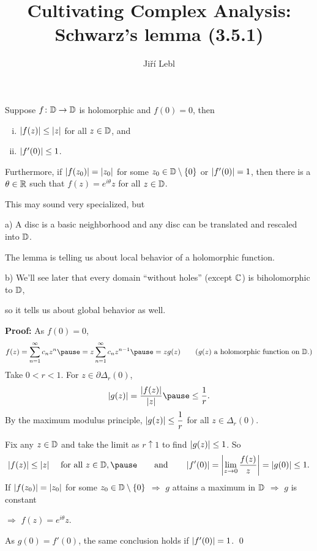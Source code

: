 \documentclass[10pt,aspectratio=169]{beamer}
\author{Ji\v{r}\'i Lebl}
\institute[OSU]{%
Departemento pri Matematiko de Oklahoma {\^S}tata Universitato}
\title{Cultivating Complex Analysis:\\%
Schwarz's lemma (3.5.1)}
\date{}
\begin{document}
\begin{frame}
\titlepage
\end{frame}

\begin{frame}
\begin{lemma}
Suppose $f \colon {\mathbb{D}} \to {\mathbb{D}}$ is holomorphic and $f(0) = 0$,
then 
\pause
\begin{enumerate}[(i)]
\item $\lvert {f(z)} \rvert \leq \lvert {z} \rvert$ for all $z \in {\mathbb{D}}$, and
\pause
\item $\lvert {f'(0)} \rvert \leq 1$.
\end{enumerate}
\pause
Furthermore, if $\lvert {f(z_0)} \rvert = \lvert {z_0} \rvert$ for some $z_0 \in {\mathbb{D}} \setminus
\{ 0 \}$
or $\lvert {f'(0)} \rvert = 1$, then
there is a $\theta \in {\mathbb{R}}$ such that $f(z) =
e^{i\theta} z$ for all $z \in {\mathbb{D}}$.
\end{lemma}

\pause

This may sound very specialized, but

\pause
\medskip

a) A disc is a basic neighborhood and any disc can be translated and rescaled
into ${\mathbb{D}}$. \pause

The lemma is telling us about local behavior of a holomorphic function.

\pause
\medskip

b) We'll see later that every domain ``without holes'' (except ${\mathbb{C}}$)
is biholomorphic to ${\mathbb{D}}$,

so it tells us about global behavior as well.

\end{frame}

\begin{frame}
\textbf{Proof:}
As $f(0) = 0$,
\[
f(z) = \sum_{n=1}^\infty c_n z^n \pause = z \sum_{n=1}^\infty c_n z^{n-1}
\pause = z g(z) \qquad \text{($g(z)$ a holomorphic function on $\D$.)}
\]
\pause
Take $0 < r < 1$.
For $z \in \partial \Delta_r(0)$,
\[
\sabs{g(z)} = \frac{\sabs{f(z)}}{\sabs{z}} \pause \leq \frac{1}{r} .
\]
\pause
By the maximum modulus principle,
$\lvert {g(z)} \rvert \leq \dfrac{1}{r}$ for all $z \in \Delta_r(0)$.

\pause
\medskip

Fix any $z \in {\mathbb{D}}$ and take the limit as $r \uparrow 1$ to find
$\lvert {g(z)} \rvert \leq 1$.
\pause
So
\[
\sabs{f(z)} \leq \sabs{z} \quad \text{ for all } z \in \D,
\pause \qquad \text{and} \qquad
\abs{f'(0)}
=
\abs{\lim_{z \to 0} \frac{f(z)}{z}} = \sabs{g(0)} \leq 1 .
\]
\pause
If $\lvert {f(z_0)} \rvert = \lvert {z_0} \rvert$ for some $z_0 \in {\mathbb{D}} \setminus \{ 0 \}$
\pause $\Rightarrow$
$g$ attains a maximum in ${\mathbb{D}}$
\pause $\Rightarrow$
$g$ is constant

\pause $\Rightarrow$ $f(z) = e^{i \theta} z$.

\medskip
\pause

As $g(0) = f'(0)$, the same conclusion holds if $\lvert {f'(0)} \rvert = 1$.
\qed
\end{frame}
\end{document}
